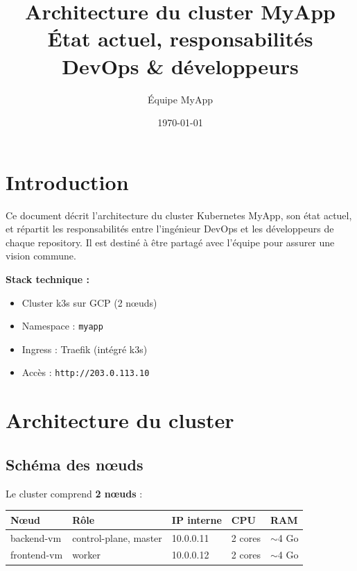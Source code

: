\documentclass[11pt,a4paper]{article}
\title{\textbf{Architecture du cluster MyApp} \\ \large État actuel, responsabilités DevOps \& développeurs}
\author{Équipe MyApp}
\date{\today}
\begin{document}
\maketitle
\tableofcontents
\newpage

\section{Introduction}

Ce document décrit l'architecture du cluster Kubernetes MyApp, son état actuel, et répartit les responsabilités entre l'ingénieur DevOps et les développeurs de chaque repository. Il est destiné à être partagé avec l'équipe pour assurer une vision commune.

\textbf{Stack technique :}
\begin{itemize}[noitemsep]
  \item Cluster k3s sur GCP (2 nœuds)
  \item Namespace : \texttt{myapp}
  \item Ingress : Traefik (intégré k3s)
  \item Accès : \texttt{http://203.0.113.10}
\end{itemize}

\section{Architecture du cluster}

\subsection{Schéma des nœuds}

Le cluster comprend \textbf{2 nœuds} :

\begin{center}
\begin{tabular}{@{}lllll@{}}
\toprule
\textbf{Nœud} & \textbf{Rôle} & \textbf{IP interne} & \textbf{CPU} & \textbf{RAM} \\
\midrule
backend-vm  & control-plane, master & 10.0.0.11 & 2 cores & $\sim$4 Go \\
frontend-vm & worker                 & 10.0.0.12 & 2 cores & $\sim$4 Go \\
\bottomrule
\end{tabular}
\end{center}
\end{document}
